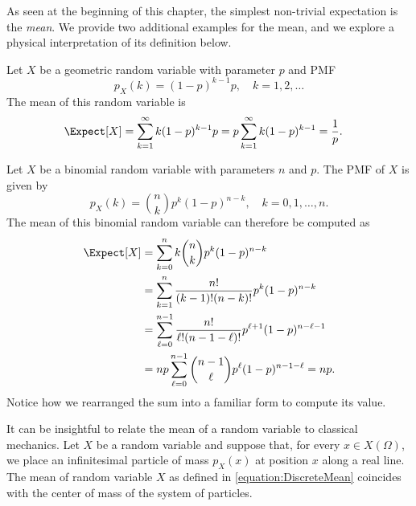 As seen at the beginning of this chapter, the simplest non-trivial expectation is the \emph{mean}.  
We provide two additional examples for the mean, and we explore a physical interpretation of its definition below.

\begin{example}
Let $X$ be a geometric random variable with parameter $p$ and PMF
\begin{equation*}
p_X (k) = (1-p)^{k-1} p, \quad k = 1, 2, \ldots
\end{equation*}
The mean of this random variable is
\begin{equation*}
\begin{split}
\Expect [X] &= \sum_{k=1}^{\infty} k (1-p)^{k-1} p
= p \sum_{k=1}^{\infty} k (1-p)^{k-1}
= \frac{1}{p} .
\end{split}
\end{equation*}
\end{example}

\begin{example}
Let $X$ be a binomial random variable with parameters $n$ and $p$.
The PMF of $X$ is given by
\begin{equation*}
p_X (k) = \binom{n}{k} p^k (1-p)^{n-k}, \quad k = 0, 1, \ldots, n.
\end{equation*}
The mean of this binomial random variable can therefore be computed as
\begin{equation*}
\begin{split}
\Expect [X] &= \sum_{k=0}^n k \binom{n}{k} p^k (1-p)^{n-k} \\
&= \sum_{k=1}^n \frac{n!}{(k-1)!(n-k)!} p^k (1-p)^{n-k} \\
&= \sum_{\ell=0}^{n-1} \frac{n!}{\ell!(n-1-\ell)!} p^{\ell+1} (1-p)^{n-\ell-1} \\
&= n p \sum_{\ell=0}^{n-1} \binom{n-1}{\ell} p^{\ell} (1-p)^{n-1-\ell}
= n p .
\end{split}
\end{equation*}
Notice how we rearranged the sum into a familiar form to compute its value.
\end{example}

It can be insightful to relate the mean of a random variable to classical mechanics.
Let $X$ be a random variable and suppose that, for every $x \in X(\Omega)$, we place an infinitesimal particle of mass $p_X(x)$ at position $x$ along a real line.
The mean of random variable $X$ as defined in \eqref{equation:DiscreteMean} coincides with the center of mass of the system of particles.

